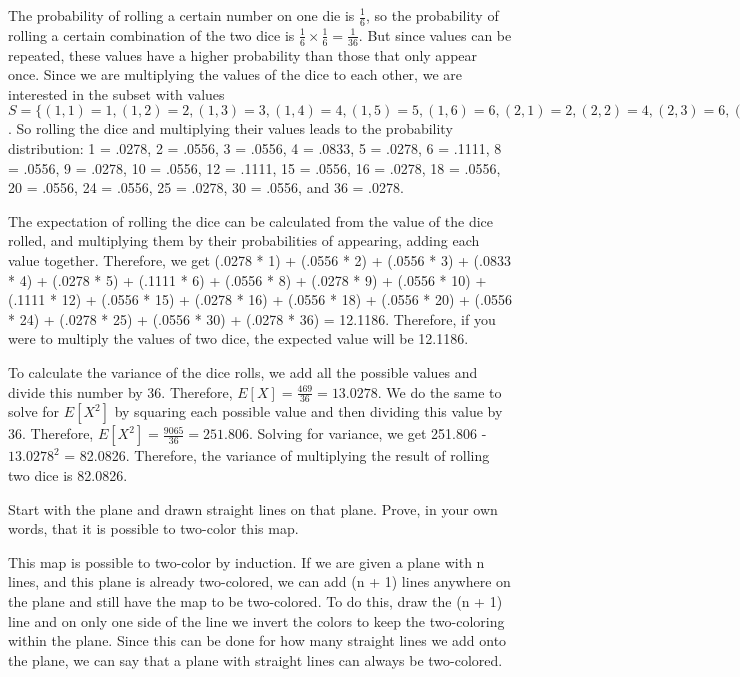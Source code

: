 \documentclass{article}
\begin{document}
The probability of rolling a certain number on one die is $\frac{1}{6}$, so the probability of rolling a certain combination of the two dice is $\frac{1}{6} \times \frac{1}{6} = \frac{1}{36}$. But since values can be repeated, these values have a higher probability than those that only appear once. Since we are multiplying the values of the dice to each other, we are interested in the subset with values $S = \{(1,1)= 1, (1,2) = 2, (1,3) = 3, (1,4) = 4, (1,5) = 5, (1,6) = 6, (2,1) = 2, (2,2) = 4, (2,3) = 6, (2,4) = 8, (2,5) = 10, (2,6) = 12, (3,1) = 3, (3,2) = 6, (3,3) = 9, (3,4) = 12, (3,5) = 15, (3,6) = 18, (4,1) = 4, (4,2) = 8, (4,3) = 12, (4,4) = 16, (4,5) = 20, (4,6) = 24, (5,1) = 5, (5,2) = 10, (5,3) = 15, (5,4) = 20, (5,5) = 25, (5,6) = 30, (6,1) = 6, (6,2) = 12, (6,3) = 18, (6,4) = 24, (6,5) = 30, (6,6) = 36\}$. So rolling the dice and multiplying their values leads to the probability distribution: 1 = .0278, 2 = .0556, 3 = .0556, 4 = .0833, 5 = .0278, 6 = .1111, 8 = .0556, 9 = .0278, 10 = .0556, 12 = .1111, 15 = .0556, 16 = .0278, 18 = .0556, 20 = .0556, 24 = .0556, 25 = .0278, 30 = .0556, and 36 = .0278.
\item The expectation of rolling the dice can be calculated from the value of the dice rolled, and multiplying them by their probabilities of appearing, adding each value together. Therefore, we get (.0278 * 1) + (.0556 * 2) + (.0556 * 3) + (.0833 * 4) + (.0278 * 5) + (.1111 * 6) + (.0556 * 8) + (.0278 * 9) + (.0556 * 10) + (.1111 * 12) + (.0556 * 15) + (.0278 * 16) + (.0556 * 18) + (.0556 * 20) + (.0556 * 24) + (.0278 * 25) + (.0556 * 30) + (.0278 * 36) = 12.1186. Therefore, if you were to multiply the values of two dice, the expected value will be 12.1186.
\item To calculate the variance of the dice rolls, we add all the possible values and divide this number by 36. Therefore, $E[X] = \frac{469}{36} = 13.0278$. We do the same to solve for $E[X^{2}]$ by squaring each possible value and then dividing this value by 36. Therefore, $E[X^{2}] = \frac{9065}{36} = 251.806$. Solving for variance, we get 251.806 - $13.0278^{2}$ = 82.0826. Therefore, the variance of multiplying the result of rolling two dice is 82.0826.

\clearpage
\header
Start with the plane and drawn straight lines on that plane. Prove, in your own words, that it is possible to two-color this map.
\item[]This map is possible to two-color by induction. If we are given a plane with n lines, and this plane is already two-colored, we can add (n + 1) lines anywhere on the plane and still have the map to be two-colored. To do this, draw the (n + 1) line and on only one side of the line we invert the colors to keep the two-coloring within the plane. Since this can be done for how many straight lines we add onto the plane, we can say that a plane with straight lines can always be two-colored. 
\end{document}
